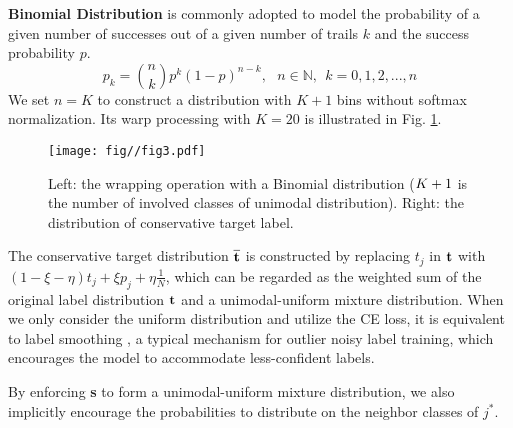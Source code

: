 \noindent\textbf{Binomial Distribution} is commonly adopted to model the probability of a given number of successes out of a given number of trails $k$ and the success probability $p$.\vspace{-5pt}\begin{equation}
p_k={n\choose k}p^k(1-p)^{n-k},~~~n\in\mathbb{N},~~k=0,1,2, ...,n
\end{equation}\vspace{-2pt}We set $n=K$ to construct a distribution with $K+1$ bins without softmax normalization. Its warp processing with $K=20$ is illustrated in Fig. \ref{fig:3}.


\begin{figure}[t]
\centering
\texttt{[image: fig//fig3.pdf]}\\
\caption{Left: the wrapping operation with a Binomial distribution ($\small K+1$ is the number of involved classes of unimodal distribution). Right: the distribution of conservative target label.}\label{fig:3}
\end{figure}

The conservative target distribution ${\rm{{\overline{\textbf{t}}}}}$ is constructed by replacing $t_{j}$ in ${\rm\textbf{t}}$ with $(1-\xi-\eta)t_{j}+\xi p_j +\eta \frac{1}{N}$, which can be regarded as the weighted sum of the original label distribution ${\rm\textbf{t}}$ and a unimodal-uniform mixture distribution. When we only consider the uniform distribution and utilize the CE loss, it is equivalent to label smoothing \cite{szegedy2016rethinking}, a typical mechanism for outlier noisy label training, which encourages the model to accommodate less-confident labels. 


By enforcing {\rm\textbf{s}} to form a unimodal-uniform mixture distribution, we also implicitly encourage the probabilities to distribute on the neighbor classes of $j^*$.


 














